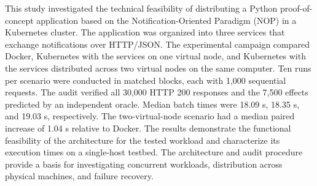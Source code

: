 \begin{abstractutfpr}
This study investigated the technical feasibility of distributing a Python proof-of-concept application based on the Notification-Oriented Paradigm (NOP) in a Kubernetes cluster. The application was organized into three services that exchange notifications over HTTP/JSON. The experimental campaign compared Docker, Kubernetes with the services on one virtual node, and Kubernetes with the services distributed across two virtual nodes on the same computer. Ten runs per scenario were conducted in matched blocks, each with 1,000 sequential requests. The audit verified all 30,000 HTTP 200 responses and the 7,500 effects predicted by an independent oracle. Median batch times were 18.09 s, 18.35 s, and 19.03 s, respectively. The two-virtual-node scenario had a median paired increase of 1.04 s relative to Docker. The results demonstrate the functional feasibility of the architecture for the tested workload and characterize its execution times on a single-host testbed. The architecture and audit procedure provide a basis for investigating concurrent workloads, distribution across physical machines, and failure recovery.
\end{abstractutfpr}
